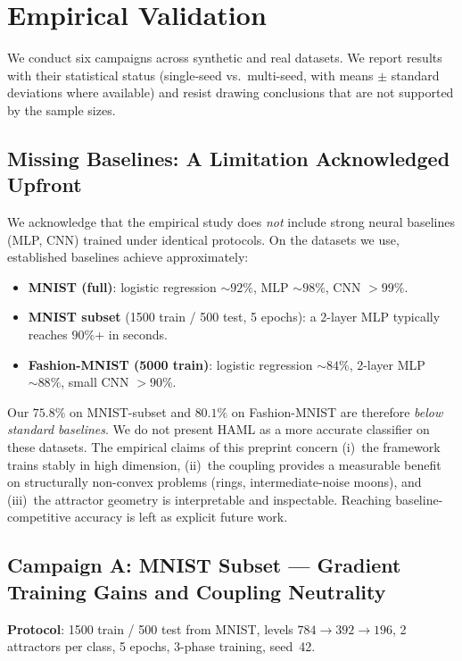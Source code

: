 \documentclass[11pt,a4paper]{article}
\begin{document}
\section{Empirical Validation}

We conduct six campaigns across synthetic and real datasets. We report results with
their statistical status (single-seed vs.\ multi-seed, with means $\pm$ standard
deviations where available) and resist drawing conclusions that are not supported by the
sample sizes.

\subsection{Missing Baselines: A Limitation Acknowledged Upfront}
\label{sec:emp:baselines}

We acknowledge that the empirical study does \emph{not} include strong neural baselines
(MLP, CNN) trained under identical protocols. On the datasets we use, established
baselines achieve approximately:
\begin{itemize}
  \item \textbf{MNIST (full)}: logistic regression $\sim 92\%$, MLP $\sim 98\%$,
        CNN $>99\%$.
  \item \textbf{MNIST subset} (1500 train / 500 test, 5 epochs): a 2-layer MLP typically
        reaches $90\%$+ in seconds.
  \item \textbf{Fashion-MNIST (5000 train)}: logistic regression $\sim 84\%$,
        2-layer MLP $\sim 88\%$, small CNN $>90\%$.
\end{itemize}
Our $75.8\%$ on MNIST-subset and $80.1\%$ on Fashion-MNIST are therefore \emph{below
standard baselines}. We do not present HAML as a more accurate classifier on these
datasets. The empirical claims of this preprint concern (i)~the framework trains stably
in high dimension, (ii)~the coupling provides a measurable benefit on structurally
non-convex problems (rings, intermediate-noise moons), and (iii)~the attractor geometry
is interpretable and inspectable. Reaching baseline-competitive accuracy is left as
explicit future work.

\subsection{Campaign A: MNIST Subset --- Gradient Training Gains and Coupling Neutrality}

\textbf{Protocol}: 1500 train / 500 test from MNIST, levels $784 \to 392 \to 196$,
2 attractors per class, 5 epochs, 3-phase training, seed~42.
\end{document}
